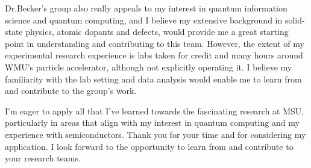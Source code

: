 \documentclass[11pt]{article}
\newcommand{\schoolabbr}{MSU}
\begin{document}
Dr.\@ Becker's group also really appeals to my interest in quantum information science and quantum computing, and I believe my extensive background in solid-state physics, atomic dopants and defects, would provide me a great starting point in understanding and contributing to this team. However, the extent of my experimental research experience is labs taken for credit and many hours around WMU's particle accelerator, although not explicitly operating it. I believe my familiarity with the lab setting and data analysis would enable me to learn from and contribute to the group's work. 

I'm eager to apply all that I've learned towards the fascinating research at \schoolabbr{}, particularly in areas that align with my interest in quantum computing and my experience with semiconductors. Thank you for your time and for considering my application. I look forward to the opportunity to learn from and contribute to your research teams.
\end{document}
